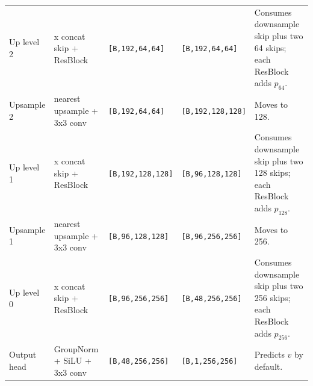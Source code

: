 \documentclass[10pt,landscape]{article}
\newcommand{\shape}[1]{\texttt{[#1]}}
\begin{document}
\begin{tabular}{>{\raggedright\arraybackslash}p{31mm} >{\raggedright\arraybackslash}p{44mm} >{\raggedright\arraybackslash}p{43mm} >{\raggedright\arraybackslash}p{42mm} >{\raggedright\arraybackslash}p{245mm}}
Up level 2 & 3 x concat skip + ResBlock & \shape{B,192,64,64} & \shape{B,192,64,64} & Consumes downsample skip plus two 64 skips; each ResBlock adds $p_{64}$. \\
Upsample 2 & nearest upsample + 3x3 conv & \shape{B,192,64,64} & \shape{B,192,128,128} & Moves to 128. \\
Up level 1 & 3 x concat skip + ResBlock & \shape{B,192,128,128} & \shape{B,96,128,128} & Consumes downsample skip plus two 128 skips; each ResBlock adds $p_{128}$. \\
Upsample 1 & nearest upsample + 3x3 conv & \shape{B,96,128,128} & \shape{B,96,256,256} & Moves to 256. \\
Up level 0 & 3 x concat skip + ResBlock & \shape{B,96,256,256} & \shape{B,48,256,256} & Consumes downsample skip plus two 256 skips; each ResBlock adds $p_{256}$. \\
Output head & GroupNorm + SiLU + 3x3 conv & \shape{B,48,256,256} & \shape{B,1,256,256} & Predicts $v$ by default. \\
\bottomrule
\end{tabular}
\normalsize

\vspace{4mm}
\end{document}
